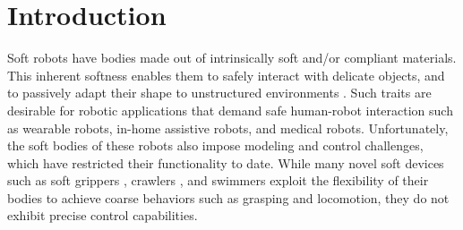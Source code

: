 \section{Introduction} 
\label{sec:intro}

Soft robots have bodies made out of intrinsically soft and/or compliant materials.
This inherent softness enables them to safely interact with delicate objects, and to passively adapt their shape to unstructured environments \cite{rus2015design}.
Such traits are desirable for robotic applications that demand safe human-robot interaction such as wearable robots, in-home assistive robots, and medical robots.
Unfortunately, the soft bodies of these robots also impose modeling and control challenges, which have restricted their functionality to date. 
While many novel soft devices such as soft grippers \cite{ilievski2011soft}, crawlers \cite{tolley2014resilient}, and swimmers \cite{marchese2014autonomous} exploit the flexibility of their bodies to achieve coarse behaviors such as grasping and locomotion, they do not exhibit precise control capabilities.



